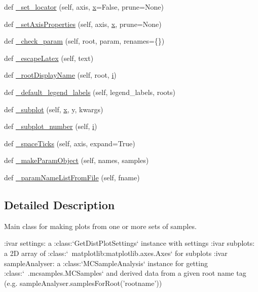\begin{DoxyCompactItemize}
\item 
def \mbox{\hyperlink{classgetdist_1_1plots_1_1GetDistPlotter_ab90583e444bd0707e6a4a632cd41ce8c}{\+\_\+set\+\_\+locator}} (self, axis, \mbox{\hyperlink{plotTT_8m_a9336ebf25087d91c818ee6e9ec29f8c1}{x}}=False, prune=None)
\item 
def \mbox{\hyperlink{classgetdist_1_1plots_1_1GetDistPlotter_a437576fb88e47274ce1c2574581daf2c}{\+\_\+set\+Axis\+Properties}} (self, axis, \mbox{\hyperlink{plotTT_8m_a9336ebf25087d91c818ee6e9ec29f8c1}{x}}, prune=None)
\item 
def \mbox{\hyperlink{classgetdist_1_1plots_1_1GetDistPlotter_a0baa9ed916992d8216ca3cc0ddf4eb4a}{\+\_\+check\+\_\+param}} (self, root, param, renames=\{\})
\item 
def \mbox{\hyperlink{classgetdist_1_1plots_1_1GetDistPlotter_a1fb43f7fb0857fd242270c3b67b30eb4}{\+\_\+escape\+Latex}} (self, text)
\item 
def \mbox{\hyperlink{classgetdist_1_1plots_1_1GetDistPlotter_ad7bb533b92ff93733da80a76c65ae47e}{\+\_\+root\+Display\+Name}} (self, root, \mbox{\hyperlink{plotTT_8m_a3359ed5f123e10953f77a90207beaa1b}{i}})
\item 
def \mbox{\hyperlink{classgetdist_1_1plots_1_1GetDistPlotter_a2dd109cafefa1d1d8f3078208c79c4a6}{\+\_\+default\+\_\+legend\+\_\+labels}} (self, legend\+\_\+labels, roots)
\item 
def \mbox{\hyperlink{classgetdist_1_1plots_1_1GetDistPlotter_aa9058a1f333a84c5d0c7b8f5c5a83da3}{\+\_\+subplot}} (self, \mbox{\hyperlink{plotTT_8m_a9336ebf25087d91c818ee6e9ec29f8c1}{x}}, y, kwargs)
\item 
def \mbox{\hyperlink{classgetdist_1_1plots_1_1GetDistPlotter_ab193e6cfc6a0ea34b119fe7d1f3aee54}{\+\_\+subplot\+\_\+number}} (self, \mbox{\hyperlink{plotTT_8m_a3359ed5f123e10953f77a90207beaa1b}{i}})
\item 
def \mbox{\hyperlink{classgetdist_1_1plots_1_1GetDistPlotter_a0f88fbf39ce5aa636bcb33ba1aaf26dd}{\+\_\+space\+Ticks}} (self, axis, expand=True)
\item 
def \mbox{\hyperlink{classgetdist_1_1plots_1_1GetDistPlotter_a1f1a9291eabe11286d6687a482558397}{\+\_\+make\+Param\+Object}} (self, names, samples)
\item 
def \mbox{\hyperlink{classgetdist_1_1plots_1_1GetDistPlotter_a63da566e8c3acdfff3865ae29e73ba4d}{\+\_\+param\+Name\+List\+From\+File}} (self, fname)
\end{DoxyCompactItemize}


\subsection{Detailed Description}
\begin{DoxyVerb}Main class for making plots from one or more sets of samples.

:ivar settings: a :class:`GetDistPlotSettings` instance with settings
:ivar subplots: a 2D array of :class:`~matplotlib:matplotlib.axes.Axes` for subplots
:ivar sampleAnalyser: a :class:`MCSampleAnalysis` instance for getting :class:`~.mcsamples.MCSamples` 
     and derived data from a given root name tag (e.g. sampleAnalyser.samplesForRoot('rootname'))
\end{DoxyVerb}
 

